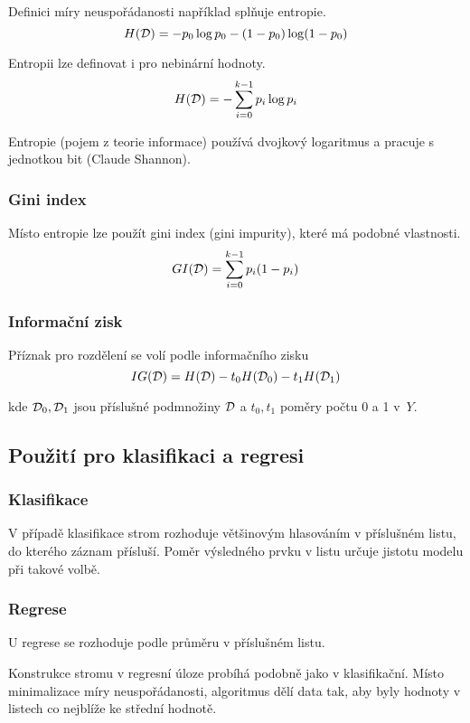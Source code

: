 \documentclass[../main.tex]{subfiles}
\begin{document}
Definici míry neuspořádanosti například splňuje entropie.
\[
    H(\mathcal{D}) = -p_0 \log p_0 - (1-p_0) \log (1-p_0)
\]

Entropii lze definovat i pro nebinární hodnoty.
\[
    H(\mathcal{D}) = - \sum_{i=0}^{k-1} p_i \log p_i
\]

Entropie (pojem z teorie informace) používá dvojkový logaritmus a pracuje s jednotkou bit (Claude Shannon).

\subsubsection{Gini index}

Místo entropie lze použít gini index (gini impurity), které má podobné vlastnosti.
\[
    GI(\mathcal{D}) = \sum_{i=0}^{k-1} p_i (1 - p_i)
\]

\subsubsection{Informační zisk}

Příznak pro rozdělení se volí podle informačního zisku
\[
    IG(\mathcal{D}) = H(\mathcal{D}) - t_0 H(\mathcal{D}_0) - t_1 H(\mathcal{D}_1)
\]

kde $\mathcal{D}_0, \mathcal{D}_1$ jsou příslušné podmnožiny $\mathcal{D}$ a $t_0, t_1$ poměry počtu 0 a 1 v~$Y$.

\subsection{Použití pro klasifikaci a regresi}

\subsubsection{Klasifikace}

V případě klasifikace strom rozhoduje většinovým hlasováním v příslušném listu, do kterého záznam přísluší. Poměr výsledného prvku v listu určuje jistotu modelu při takové volbě.

\subsubsection{Regrese}

U regrese se rozhoduje podle průměru v příslušném listu.

Konstrukce stromu v regresní úloze probíhá podobně jako v klasifikační. Místo minimalizace míry neuspořádanosti, algoritmus dělí data tak, aby byly hodnoty v listech co nejblíže ke střední hodnotě.
\end{document}
